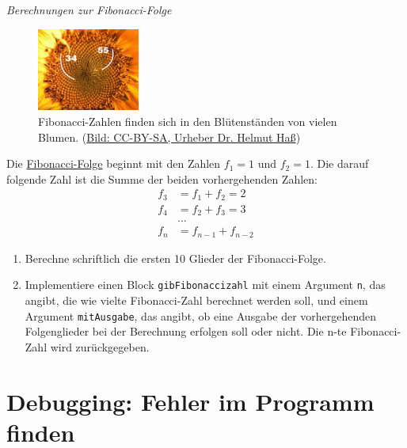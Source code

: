 \begin{aufgabe} \emph{Berechnungen zur Fibonacci-Folge}
	
	\begin{figure}
		\vspace{-0.5\baselineskip}
		\centering
		\includegraphics[width=0.3\textwidth]{./pics/fibonacci-sonnenblume.jpg}
		\caption{Fibonacci-Zahlen finden sich in den Blütenständen von vielen Blumen. (\href{https://de.wikipedia.org/wiki/Datei:Goldener_Schnitt_Bluetenstand_Sonnenblume.jpg}{Bild: CC-BY-SA, Urheber Dr. Helmut Haß})}
		\vspace{-4\baselineskip}
	\end{figure}
	Die \href{https://de.wikipedia.org/wiki/Fibonacci-Folge}{Fibonacci-Folge} beginnt mit den Zahlen $f_1 = 1$ und $f_2 = 1$. Die darauf folgende Zahl ist die Summe der beiden vorhergehenden Zahlen:
	\begin{align*}
		f_3 &= f_1 + f_2 = 2 \\
		f_4 &= f_2 + f_3 = 3 \\
		&\dots \\
		f_n &= f_{n-1} + f_{n-2}
	\end{align*}
	
	\begin{enumerate}[label=\alph*), itemsep=0ex, parsep=0ex]
		\item Berechne schriftlich die ersten 10 Glieder der Fibonacci-Folge.
		\item Implementiere einen Block \texttt{gibFibonaccizahl} mit einem Argument \texttt{n}, das angibt, die wie vielte Fibonacci-Zahl berechnet werden soll, und einem Argument \texttt{mitAusgabe}, das angibt, ob eine Ausgabe der vorhergehenden Folgenglieder bei der Berechnung erfolgen soll oder nicht. Die n-te Fibonacci-Zahl wird zurückgegeben.
	\end{enumerate}
\end{aufgabe}

\newpage
\section{Debugging: Fehler im Programm finden}
\label{sec:debugging}

